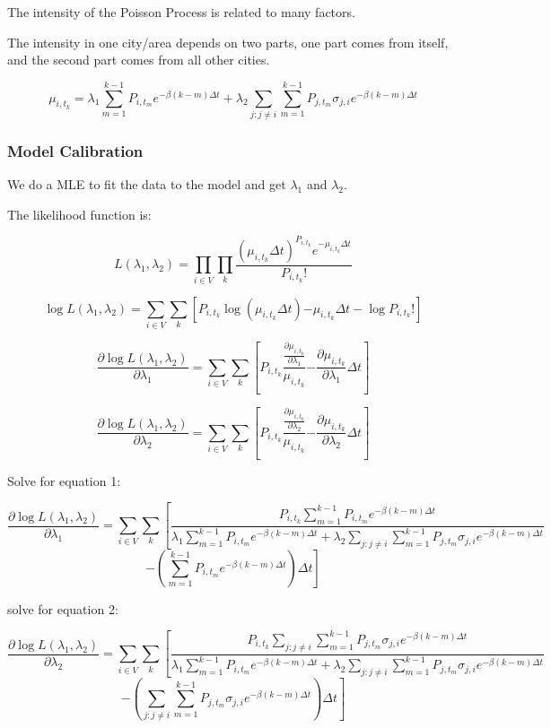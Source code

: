 \documentclass[11pt]{article}
\begin{document}
The intensity of the Poisson Process is related to many factors. 

The intensity in one city/area depends on two parts, one part comes from itself, and the second part comes from all other cities. 




$$\mu_{i,t_k} = \lambda_1 \sum_{m = 1}^{ k-1} P_{i,t_m} e^{-\beta(k-m)\Delta t} + \lambda_2 \sum_{j:j\neq i} \sum_{m = 1}^{ k-1} P_{j,t_m} \sigma_{j,i} e^{-\beta(k-m)\Delta t }$$

\subsubsection{Model Calibration}

We do a MLE to fit the data to the model and get $\lambda_1$ and $\lambda_2$.

The likelihood function is:

$$L(\lambda_1, \lambda_2) = \prod_{i \in V} \prod_{k} \frac{(\mu_{i,t_k}\Delta t)^{P_{i,t_k}} e^{-\mu_{i,t_k}\Delta t}}{P_{i,t_k}!}
$$


$$
\log L(\lambda_1, \lambda_2) = \sum_{i \in V} \sum_{k}\left[ {P_{i,t_k} \log{(\mu_{i,t_k}\Delta t)} {-\mu_{i,t_k}\Delta t}} - \log{P_{i,t_k}!} \right]
$$


$$
\frac{\partial \log L(\lambda_1, \lambda_2)}{\partial \lambda_1} = \sum_{i \in V} \sum_{k}\left[ {P_{i,t_k} \frac{ \frac{\partial \mu_{i,t_k}}{\partial \lambda_1}}{\mu_{i,t_k}} {- \frac{\partial \mu_{i,t_k}}{\partial \lambda_1}\Delta t}} \right] 
$$


$$
\frac{\partial \log L(\lambda_1, \lambda_2)}{\partial \lambda_2} = \sum_{i \in V} \sum_{k}\left[ {P_{i,t_k} \frac{ \frac{\partial \mu_{i,t_k}}{\partial \lambda_2}}{\mu_{i,t_k}} {- \frac{\partial \mu_{i,t_k}}{\partial \lambda_2}\Delta t}} \right] 
$$

Solve for equation 1:

$$
\frac{\partial \log L(\lambda_1, \lambda_2)}{\partial \lambda_1} = \sum_{i \in V} \sum_{k}\left[ { \frac{P_{i,t_k}\sum_{m = 1}^{ k-1} P_{i,t_m} e^{-\beta(k-m)\Delta t}}{ \lambda_1 \sum_{m = 1}^{ k-1} P_{i,t_m} e^{-\beta(k-m)\Delta t} + \lambda_2 \sum_{j:j\neq i} \sum_{m = 1}^{ k-1} P_{j,t_m} \sigma_{j,i} e^{-\beta(k-m)\Delta t}}} \right.
$$
$$
\left. {- \left( \sum_{m = 1}^{ k-1} P_{i,t_m} e^{-\beta(k-m)\Delta t} \right)\Delta t} \right] 
$$

solve for equation 2:

$$
\frac{\partial \log L(\lambda_1, \lambda_2)}{\partial \lambda_2} = \sum_{i \in V} \sum_{k}\left[ { \frac{P_{i,t_k}\sum_{j:j\neq i} \sum_{m = 1}^{ k-1} P_{j,t_m} \sigma_{j,i} e^{-\beta(k-m)\Delta t} }{ \lambda_1 \sum_{m = 1}^{ k-1} P_{i,t_m} e^{-\beta(k-m)\Delta t} + \lambda_2 \sum_{j:j\neq i} \sum_{m = 1}^{ k-1} P_{j,t_m} \sigma_{j,i} e^{-\beta(k-m)\Delta t}}} \right.
$$
$$
\left. {- \left( \sum_{j:j\neq i} \sum_{m = 1}^{ k-1} P_{j,t_m} \sigma_{j,i} e^{-\beta(k-m)\Delta t} \right)\Delta t} \right] 
$$
\end{document}
